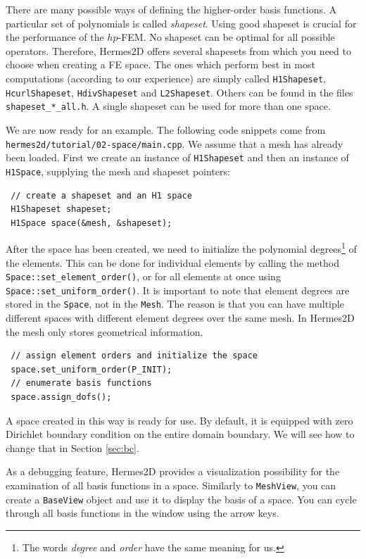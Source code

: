 \documentclass[11pt]{article}
\begin{document}
There are many possible ways of defining the
higher-order basis functions. A particular set of polynomials is called
\emph{shapeset}. Using good shapeset is crucial for the
performance of the $hp$-FEM. No shapeset can be optimal for all possible operators.
Therefore, Hermes2D offers several shapesets from which
you need to choose when creating a FE space. The ones which perform best
in most computations (according to our experience) are simply called
{\tt H1Shapeset}, {\tt HcurlShapeset}, {\tt HdivShapeset} and {\tt L2Shapeset}.
Others can be found in the files {\tt shapeset\_*\_all.h}. A single shapeset
can be used for more than one space.

We are now ready for an example. The following code snippets come from
\verb"hermes2d/tutorial/02-space/main.cpp". We assume that a mesh has already
been loaded. First we create an instance of {\tt H1Shapeset} and then an
instance of {\tt H1Space}, supplying the mesh and shapeset pointers:

\begin{lstlisting}
 // create a shapeset and an H1 space
 H1Shapeset shapeset;
 H1Space space(&mesh, &shapeset);
\end{lstlisting}

After the space has been created, we need to initialize the polynomial
degrees\footnote{The words \emph{degree} and \emph{order} have the same meaning for us.}
of the elements. This can be done for individual elements by calling the method
\verb"Space::set_element_order()", or for all elements at once using
\verb"Space::set_uniform_order()". It is important to note that element degrees
are stored in the {\tt Space}, not in the {\tt Mesh}. The reason is that you can
have multiple different spaces with different element degrees over the same mesh.
In Hermes2D the mesh only stores geometrical information.

\begin{lstlisting}
 // assign element orders and initialize the space
 space.set_uniform_order(P_INIT);
 // enumerate basis functions
 space.assign_dofs();
\end{lstlisting}

A space created in this way is ready for use. By default, it is equipped with
zero Dirichlet boundary condition on the entire domain boundary. We will see
how to change that in Section \ref{sec:bc}.

As a debugging feature, Hermes2D provides a visualization possibility for the
examination of all basis functions in a space. Similarly to {\tt MeshView},
you can create a {\tt BaseView} object and use it to display the basis of a space.
You can cycle through all basis functions in the window using the arrow keys.
\end{document}
